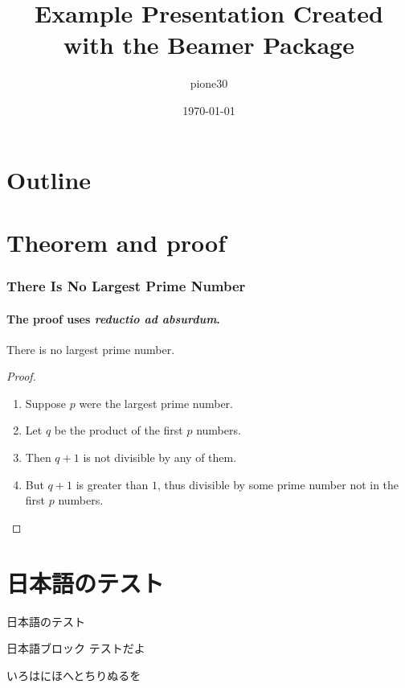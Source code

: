 \documentclass[dvipdfmx]{beamer}
\title{Example Presentation Created with the Beamer Package}
\author{pione30}
\date{\today}
\begin{document}
  \frame[plain]{\titlepage}

\section*{Outline}

  \begin{frame}
    \tableofcontents
  \end{frame}

\section{Theorem and proof}

  \begin{frame}
    \frametitle{There Is No Largest Prime Number}
    \framesubtitle{The proof uses \textit{reductio ad absurdum}.}
    
    \begin{theorem}
      There is no largest prime number.
    \end{theorem}

    \begin{proof}
      \begin{enumerate}
        \item<1-| alert@1> Suppose $p$ were the largest prime number.
        \item<2-> Let $q$ be the product of the first $p$ numbers.
        \item<3-> Then $q+1$ is not divisible by any of them.
        \item<4-> But $q + 1$ is greater than $1$, thus divisible by some prime
        number not in the first $p$ numbers.\qedhere
      \end{enumerate}
    \end{proof}
  \end{frame}

\section{日本語のテスト}

  \begin{frame}{日本語のテスト}
    \begin{block}{日本語ブロック}
      テストだよ

      いろはにほへとちりぬるを\\
    \end{block}
  \end{frame}
\end{document}
